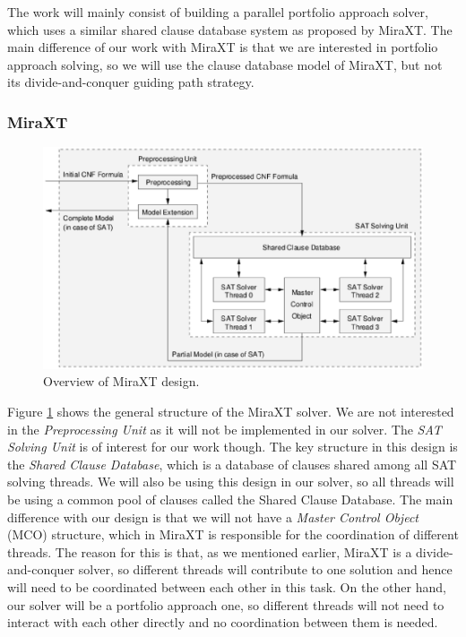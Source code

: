 \documentclass[12pt]{diicc}
\begin{document}
The work will mainly consist of building a parallel portfolio approach solver, which uses a similar shared clause database system as proposed by MiraXT. The main difference of our work with MiraXT is that we are interested in portfolio approach solving, so we will use the clause database model of MiraXT, but not its divide-and-conquer guiding path strategy. 

\subsubsection{MiraXT}

\begin{figure}[h!]
	\centering
		\includegraphics[scale=0.7]{miraxt}
	\caption{Overview of MiraXT design.}
	\label{fig:miraxt overview}
\end{figure}

Figure \ref{fig:miraxt overview} shows the general structure of the MiraXT solver. We are not interested in the \textit{Preprocessing Unit} as it will not be implemented in our solver. The \textit{SAT Solving Unit} is of interest for our work though. The key structure in this design is the \textit{Shared Clause Database}, which is a database of clauses shared among all SAT solving threads. We will also be using this design in our solver, so all threads will be using a common pool of clauses called the Shared Clause Database. The main difference with our design is that we will not have a \textit{Master Control Object} (MCO) structure, which in MiraXT is responsible for the coordination of different threads. The reason for this is that, as we mentioned earlier, MiraXT is a divide-and-conquer solver, so different threads will contribute to one solution and hence will need to be coordinated between each other in this task. On the other hand, our solver will be a portfolio approach one, so different threads will not need to interact with each other directly and no coordination between them is needed.
\end{document}
